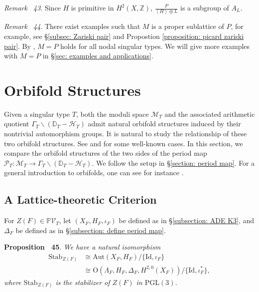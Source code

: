 \documentclass[
]{article}
\begin{document}
\emph{Remark~ 43}. Since \(H\) is primitive in \(H^2(X,\mathbb{Z})\),
\(\frac{P}{\left\langle H \right\rangle \oplus L}\) is a subgroup of
\(A_L\).

\emph{Remark~ 44}. There exist examples such that \(M\) is a proper
sublattice of \(P\), for example, see §\ref{subsec: Zariski pair} and
Propostion \ref{proposition: picard zariski pair}. By
\cite[Proposition 3.4]{yu2023moduli}, \(M=P\) holds for all nodal
singular types. We will give more examples with \(M=P\) in
§\ref{sec: examples and applications}.

\section{Orbifold Structures}\label{sec:ux20orbifoldux20structures}

Given a singular type \(T\), both the moduli space \(\mathcal{M}_T\) and
the associated arithmetic quotient
\(\Gamma_T\backslash(\mathbb{D}_T-\mathcal{H}_T)\) admit natural
orbifold structures induced by their nontrivial automorphism groups. It
is natural to study the relationship of these two orbifold structures.
See \cite{kudla2012occult} and \cite{zheng2021orbifold} for some
well-known cases. In this section, we compare the orbifold structures of
the two sides of the period map
\(\mathscr{P}_T\colon \mathcal{M}_T\to \Gamma_T\backslash(\mathbb{D}_T-\mathcal{H}_T)\).
We follow the setup in §\ref{section: period map}. For a general
introduction to orbifolds, one can see for instance
\cite[Chapter 13]{thurston2022geometry}.

\subsection{A Lattice-theoretic
Criterion}\label{a-lattice-theoretic-criterion}

For \(Z(F)\in \mathbb{P}\mathcal{V}_T\), let \((X_F,H_F,\iota_F)\) be
defined as in §\ref{subsection: ADE K3}, and \(\Delta_F\) be defined as
in §\ref{subsection: define period map}.

\textbf{Proposition~ 45}. \emph{\label{prop: describe Stab_Z(F)} We have
a natural isomorphism \[\begin{aligned}
        \mathrm{Stab}_{Z(F)} &\cong \mathrm{Aut}(X_F,H_F)/\{\mathrm{Id},\iota_F\} \\
        &\cong \mathrm{O}(\Lambda_F,H_F,\Delta_F,H^{2,0}(X_F))/\{\mathrm{Id},\iota_F^*\},
    
\end{aligned}\] where \(\mathrm{Stab}_{Z(F)}\) is the stabilizer of
\(Z(F)\) in \(\mathrm{PGL}(3)\).}
\end{document}
